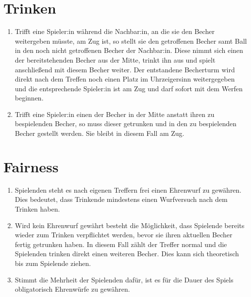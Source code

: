 \section{Trinken}
\begin{enumerate}[label={(\arabic*)}]
    \item
    Trifft eine Spieler:in während die Nachbar:in, an die sie den Becher weitergeben müsste, am Zug ist, so stellt sie den getroffenen Becher samt Ball in den noch nicht getroffenen Becher der Nachbar:in.
    Diese nimmt sich einen der bereitstehenden Becher aus der Mitte, trinkt ihn aus und spielt anschließend mit diesem Becher weiter.
    Der entstandene Becherturm wird direkt nach dem Treffen noch einen Platz im Uhrzeigersinn weitergegeben und die entsprechende Spieler:in ist am Zug und darf sofort mit dem Werfen beginnen.

    \item
    Trifft eine Spieler:in einen der Becher in der Mitte anstatt ihren zu bespielenden Becher, so muss dieser getrunken und in den zu bespielenden Becher gestellt werden.
    Sie bleibt in diesem Fall am Zug.
\end{enumerate}

\section{Fairness}
\begin{enumerate}[label={(\arabic*)}]
    \item
    Spielenden steht es nach eigenen Treffern frei einen \glqq{}Ehrenwurf\grqq{} zu gewähren.
    Dies bedeutet, dass Trinkende mindestens einen Wurfversuch nach dem Trinken haben.

    \item
    Wird kein Ehrenwurf gewährt besteht die Möglichkeit, dass Spielende bereits wieder zum Trinken verpflichtet werden, bevor sie ihren aktuellen Becher fertig getrunken haben.
    In diesem Fall zählt der Treffer normal und die Spielenden trinken direkt einen weiteren Becher.
    Dies kann sich theoretisch bis zum Spielende ziehen.

    \item
    Stimmt die Mehrheit der Spielenden dafür, ist es für die Dauer des Spiels obligatorisch Ehrenwürfe zu gewähren.
\end{enumerate}

